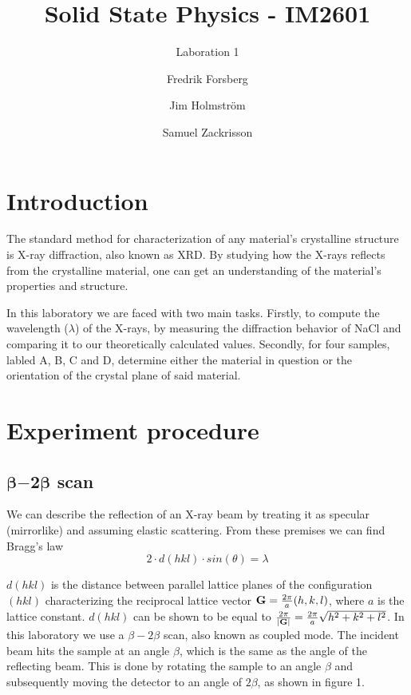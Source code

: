 \documentclass[a4paper,twoside=false,abstract=false,numbers=noenddot,
titlepage=false,headings=small,parskip=half,version=last]{scrartcl}
\title{Solid State Physics - IM2601}
\subtitle{Laboration 1}
\author[1]{Fredrik Forsberg}
\author[1]{Jim Holmström}
\author[1]{Samuel Zackrisson}
\affil[1]{Engineering Physics, Royal Institute of Technology}
\affil[1]{\{fforsber, jimho, samuelz\}@kth.se}
\begin{document}
\maketitle
\thispagestyle{empty}

\section{Introduction}
The standard method for characterization of any material's crystalline structure is X-ray diffraction, also known as XRD.
By studying how the X-rays reflects from the crystalline material, one can get an understanding of the material's properties and structure.

In this laboratory we are faced with two main tasks.
Firstly, to compute the wavelength ($\lambda$) of the X-rays, by measuring the diffraction behavior of NaCl and comparing it to our theoretically calculated values.
Secondly, for four samples, labled A, B, C and D, determine either the material in question or the orientation of the crystal plane of said material.

\section{Experiment procedure}
\subsection{$\boldsymbol{\beta}\boldsymbol{-}\boldsymbol{2}\boldsymbol{\beta}$ scan}
We can describe the reflection of an X-ray beam by treating it as specular (mirrorlike) and assuming elastic scattering. From these premises we can find Bragg's law
\begin{equation}
    \label{eq:braggs}
    2 \cdot d(hkl) \cdot sin( \theta ) = \lambda
\end{equation}

$d(hkl)$ is the distance between parallel lattice planes of the configuration $(hkl)$
characterizing the reciprocal lattice vector $\bold{G}=\frac{2\pi}{a}(h,k,l)$, where $a$ is the lattice constant.
$d(hkl)$ can be shown to be equal to $\frac{2\pi}{\left\vert \bold{G} \right\vert} = \frac{2\pi}{a}\sqrt{h^2+k^2+l^2}$.
In this laboratory we use a $\beta-2\beta$ scan, also known as coupled mode.
The incident beam hits the sample at an angle $\beta$, which is the same as the angle of the reflecting beam.
This is done by rotating the sample to an angle $\beta$ and subsequently moving the detector to an angle of $2\beta$, as shown in figure 1.
\end{document}
